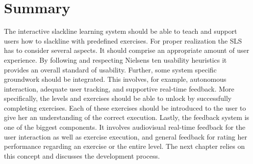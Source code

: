 \section{Summary}\label{4_7_conclusion}
The interactive slackline learning system should be able to teach and support users how to slackline with predefined exercises. For proper realization the SLS has to consider several aspects. It should comprise an appropriate amount of user experience. By following and respecting Nielsens ten usability heuristics it provides an overall standard of usability. Further, some system specific groundwork should be integrated. This involves, for example, autonomous interaction, adequate user tracking, and supportive real-time feedback. More specifically, the levels and exercises should be able to unlock by successfully completing exercises. Each of these exercises should be introduced to the user to give her an understanding of the correct execution. Lastly, the feedback system is one of the biggest components. It involves audiovisual real-time feedback for the user interaction as well as exercise execution, and general feedback for rating her performance regarding an exercise or the entire level. The next chapter \textit{} relies on this concept and discusses the development process.
